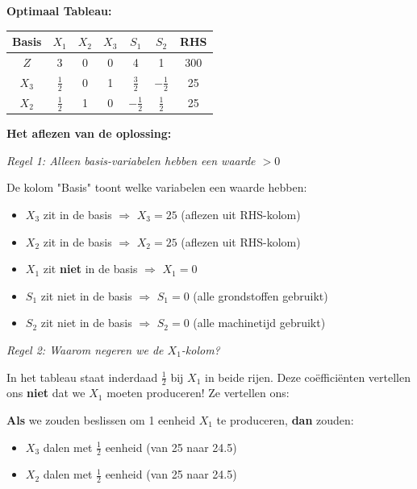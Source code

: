 \documentclass[a4paper,11pt]{article}
\begin{document}
\begin{oefenblok}[title=Productie Optimalisatie bij een Bedrijf]
\textbf{Optimaal Tableau:}

\begin{center}
\begin{tabular}{c|ccccc|c}
\hline
Basis & $X_1$ & $X_2$ & $X_3$ & $S_1$ & $S_2$ & RHS \\
\hline
$Z$ & 3 & 0 & 0 & 4 & 1 & 300 \\
$X_3$ & $\frac{1}{2}$ & 0 & 1 & $\frac{3}{2}$ & $-\frac{1}{2}$ & 25 \\
$X_2$ & $\frac{1}{2}$ & 1 & 0 & $-\frac{1}{2}$ & $\frac{1}{2}$ & 25 \\
\hline
\end{tabular}
\end{center}

\textbf{Het aflezen van de oplossing:}

\textit{Regel 1: Alleen basis-variabelen hebben een waarde $> 0$}

De kolom "Basis" toont welke variabelen een waarde hebben:
\begin{itemize}
    \item $X_3$ zit in de basis $\Rightarrow$ $X_3 = 25$ (aflezen uit RHS-kolom)
    \item $X_2$ zit in de basis $\Rightarrow$ $X_2 = 25$ (aflezen uit RHS-kolom)
    \item $X_1$ zit \textbf{niet} in de basis $\Rightarrow$ $X_1 = 0$
    \item $S_1$ zit niet in de basis $\Rightarrow$ $S_1 = 0$ (alle grondstoffen gebruikt)
    \item $S_2$ zit niet in de basis $\Rightarrow$ $S_2 = 0$ (alle machinetijd gebruikt)
\end{itemize}

\textit{Regel 2: Waarom negeren we de $X_1$-kolom?}

In het tableau staat inderdaad $\frac{1}{2}$ bij $X_1$ in beide rijen. Deze coëfficiënten vertellen ons \textbf{niet} dat we $X_1$ moeten produceren! Ze vertellen ons:

\begin{warningbox}[title=Interpretatie van niet-basis variabelen]
\textbf{Als} we zouden beslissen om 1 eenheid $X_1$ te produceren, \textbf{dan} zouden:
\begin{itemize}
    \item $X_3$ dalen met $\frac{1}{2}$ eenheid (van 25 naar 24.5)
    \item $X_2$ dalen met $\frac{1}{2}$ eenheid (van 25 naar 24.5)
\end{itemize}
\end{warningbox}


\end{oefenblok}
\end{document}
